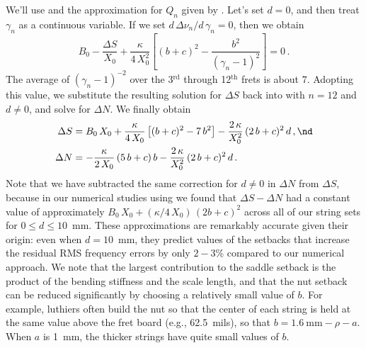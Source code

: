 We'll use  and the approximation for $Q_n$ given by . Let's set $d = 0$, and then treat $\gamma_n$ as a continuous variable. If we set $d\, \Delta \nu_n / d\, \gamma_n = 0$, then we obtain
\begin{equation}
  B_0 - \frac{\Delta S}{X_0} + \frac{\kappa}{4\, X_0^2} \left[ (b + c)^2 - \frac{b^2}{(\gamma_n - 1)^2} \right] = 0\, .
\end{equation}
The average of $(\gamma_n - 1)^{-2}$ over the 3$^\textrm{rd}$ through 12$^\textrm{th}$ frets is about $7$. Adopting this value, we substitute the resulting solution for $\Delta S$ back into  with $n = 12$ and $d \ne 0$, and solve for $\Delta N$. We finally obtain
\begin{subequations} \label{eqn:comp_approx}
  \begin{align}
    \label{eqn:comp_approx_ds} \Delta S &= B_0\, X_0 + \frac{\kappa}{4\, X_0} \left[(b + c)^2 - 7\, b^2\right] - \frac{2\, \kappa}{X_0^2}\, (2\, b + c)^2\, d\, , \nd \\
    \label{eqn:comp_approx_dn} \Delta N &= -\frac{\kappa}{2\, X_0}\, (5\, b + c)\, b - \frac{2\, \kappa}{X_0^2}\, (2\, b + c)^2\, d\, .
  \end{align}
\end{subequations}
Note that we have subtracted the same correction for $d \ne 0$ in $\Delta N$ from $\Delta S$, because in our numerical studies using  we found that $\Delta S - \Delta N$ had a constant value of approximately $B_0\, X_0 + (\kappa/4\, X_0)\, (2 b + c)^2$ across all of our string sets for $0 \le d \le 10$~mm. These approximations are remarkably accurate given their origin: even when $d = 10$~mm, they predict values of the setbacks that increase the residual RMS frequency errors by only $2 - 3$\% compared to our numerical approach. We note that the largest contribution to the saddle setback is the product of the bending stiffness and the scale length, and that the nut setback can be reduced significantly by choosing a relatively small value of $b$. For example, luthiers often build the nut so that the center of each string is held at the same value above the fret board (e.g., 62.5~mils), so that $b = 1.6 \mathrm{~mm} - \rho - a$. When $a$ is 1~mm, the thicker strings have quite small values of $b$.


